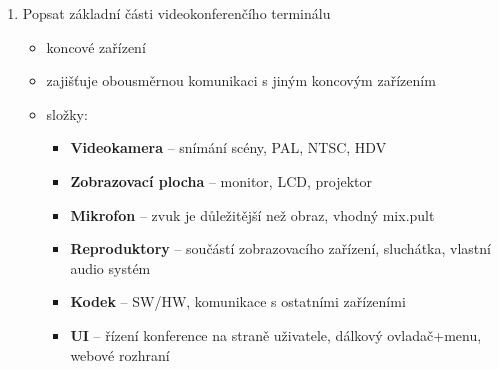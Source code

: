 \documentclass[12pt,a4paper,titlepage,final]{article}
\begin{document}
\begin{enumerate}
	\item Popsat základní části videokonferenčího terminálu	
	\begin{itemize}
		\item koncové zařízení
		\item zajišťuje obousměrnou komunikaci s jiným koncovým zařízením
		\item složky:
		\begin{itemize}
			\item \textbf{Videokamera} -- snímání scény, PAL, NTSC, HDV
			\item \textbf{Zobrazovací plocha} -- monitor, LCD, projektor
			\item \textbf{Mikrofon} -- zvuk je důležitější než obraz, vhodný mix.pult
			\item \textbf{Reproduktory} -- součástí zobrazovacího zařízení, sluchátka, vlastní audio systém
			\item \textbf{Kodek} -- SW/HW, komunikace s ostatními zařízeními
			\item \textbf{UI} -- řízení konference na straně uživatele, dálkový ovladač+menu, webové rozhraní	
		\end{itemize}	
	\end{itemize}

\end{enumerate}
\end{document}
